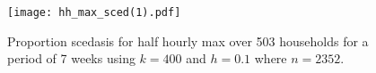 
\begin{figure}
\centering
\texttt{[image: hh\_max\_sced(1).pdf]}
\caption{\label{fig:mysced_hh_max} Proportion scedasis for half hourly max over 503 households for a period of 7 weeks using $k=400$ and $h=0.1$ where $n=2352$.}
\end{figure}


